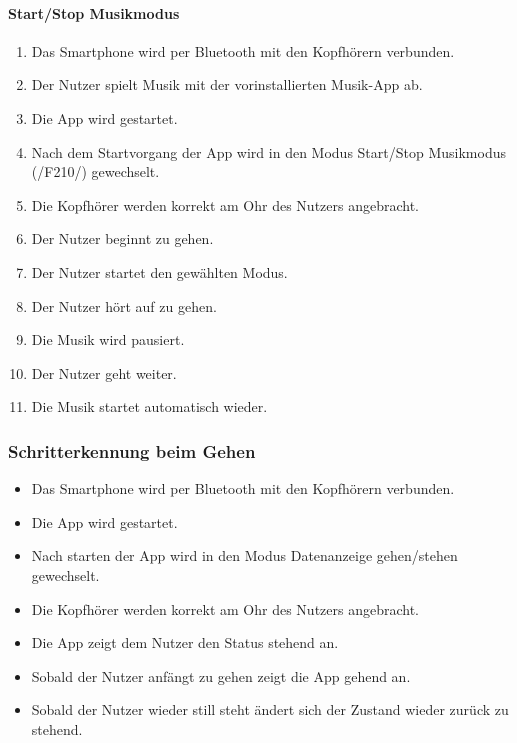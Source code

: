 \documentclass[a4paper,12pt]{article}
\begin{document}
  \paragraph{Start/Stop Musikmodus}
  \begin{enumerate}
    \item Das Smartphone wird per Bluetooth mit den Kopfhörern verbunden.
    \item Der Nutzer spielt Musik mit der vorinstallierten Musik-App ab.
    \item Die App wird gestartet.
    \item Nach dem Startvorgang der App wird in den Modus \glqq Start/Stop Musikmodus\grqq{} (/F210/) gewechselt.
    \item Die Kopfhörer werden korrekt am Ohr des Nutzers angebracht.
    \item Der Nutzer beginnt zu gehen.
    \item Der Nutzer startet den gewählten Modus.
    \item Der Nutzer hört auf zu gehen.
    \item Die Musik wird pausiert.
    \item Der Nutzer geht weiter.
    \item Die Musik startet automatisch wieder.
  \end{enumerate}

  \subsubsection{Schritterkennung beim Gehen}
    \begin{itemize}
    \item[]Das Smartphone wird per Bluetooth mit den Kopfhörern verbunden.
    \item[]Die App wird gestartet.
    \item[]Nach starten der App wird in den Modus \glqq Datenanzeige gehen/stehen\grqq{} gewechselt.
    \item[]Die Kopfhörer werden korrekt am Ohr des Nutzers angebracht.
    \item[]Die App zeigt dem Nutzer den Status \glqq stehend\grqq{} an.
    \item[]Sobald der Nutzer anfängt zu gehen zeigt die App \glqq gehend\grqq{} an.
    \item[]Sobald der Nutzer wieder still steht ändert sich der Zustand wieder zurück zu \glqq stehend\grqq. 
  \end{itemize}
\end{document}
